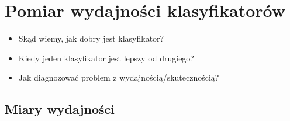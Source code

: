\documentclass[11pt, xcolor={dvipsnames,svgnames},aspectratio=169]{beamer}
\theoremstyle{plain}
\theoremstyle{plain}
\begin{document}
\section{Pomiar wydajności klasyfikatorów}

\begin{frame}
	\begin{itemize}
		\item Skąd wiemy, jak dobry jest klasyfikator?
		\item Kiedy jeden klasyfikator jest lepszy od drugiego?
		\item Jak diagnozować problem z wydajnością/skutecznością?
	\end{itemize}
\end{frame}

\subsection{Miary wydajności}
\end{document}
